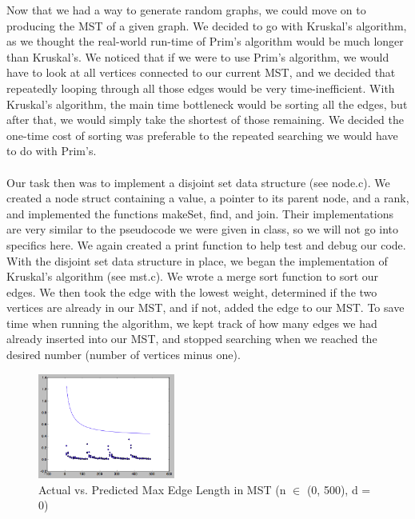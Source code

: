 \documentclass[12pt]{article}
\begin{document}
Now that we had a way to generate random graphs, we could move on to producing the MST of a given graph. We decided to go with Kruskal's algorithm, as we thought the real-world run-time of Prim's algorithm would be much longer than Kruskal's. We noticed that if we were to use Prim's algorithm, we would have to look at all vertices connected to our current MST, and we decided that repeatedly looping through all those edges would be very time-inefficient. With Kruskal's algorithm, the main time bottleneck would be sorting all the edges, but after that, we would simply take the shortest of those remaining. We decided the one-time cost of sorting was preferable to the repeated searching we would have to do with Prim's. \\\\

Our task then was to implement a disjoint set data structure (see node.c). We created a node struct containing a value, a pointer to its parent node, and a rank, and implemented the functions makeSet, find, and join. Their implementations are very similar to the pseudocode we were given in class, so we will not go into specifics here. We again created a print function to help test and debug our code. \\

With the disjoint set data structure in place, we began the implementation of Kruskal's algorithm (see mst.c). We wrote a merge sort function to sort our edges. We then took the edge with the lowest weight, determined if the two vertices are already in our MST, and if not, added the edge to our MST. To save time when running the algorithm, we kept track of how many edges we had already inserted into our MST, and stopped searching when we reached the desired number (number of vertices minus one). \\

\begin{figure}
\vspace{-0.5cm}
\centering
\includegraphics[width=0.4\textwidth]{img/knd0n1.png}
\caption{Actual vs. Predicted Max Edge Length in MST (n $\in$ (0, 500), d = 0)}
\end{figure}
\end{document}
